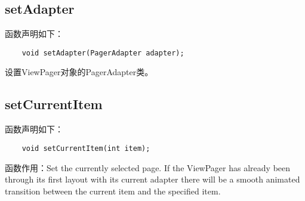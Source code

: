 \documentclass[a4paper,left=2.5cm,right=2.5cm,11pt]{article}
\begin{document}
\subsection{setAdapter}
	函数声明如下：
	\begin{lstlisting}
	void setAdapter(PagerAdapter adapter);
	\end{lstlisting}

	设置ViewPager对象的PagerAdapter类。

\subsection{setCurrentItem}
	函数声明如下：
	\begin{lstlisting}
	void setCurrentItem(int item);
	\end{lstlisting}

	函数作用：Set the currently selected page. If the ViewPager has already been through its first layout with its current adapter there will be a smooth animated transition between the current item and the specified item.
\end{document}
